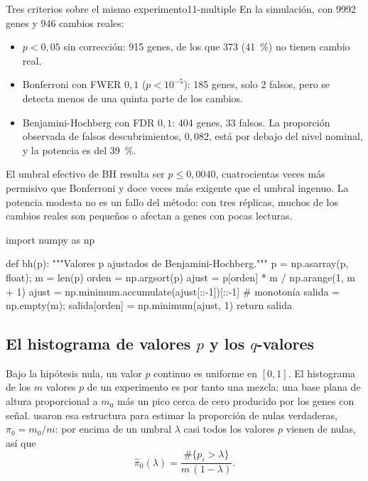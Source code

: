 \begin{ejemplo}{Tres criterios sobre el mismo experimento}{11-multiple}
En la simulación, con \num{9992} genes y \num{946} cambios reales:
\begin{itemize}
  \item $p<0{,}05$ sin corrección: 915 genes, de los que 373 (\SI{41}{\percent}) no tienen cambio real.
  \item Bonferroni con FWER $0{,}1$ ($p<10^{-5}$): 185 genes, solo 2 falsos, pero se detecta menos de una quinta parte de los cambios.
  \item Benjamini-Hochberg con FDR $0{,}1$: 404 genes, 33 falsos. La proporción observada de falsos descubrimientos, $0{,}082$, está por debajo del nivel nominal, y la potencia es del \SI{39}{\percent}.
\end{itemize}
El umbral efectivo de BH resulta ser $p\le0{,}0040$, cuatrocientas veces más permisivo que Bonferroni y doce veces más exigente que el umbral ingenuo. La potencia modesta no es un fallo del método: con tres réplicas, muchos de los cambios reales son pequeños o afectan a genes con pocas lecturas.
\end{ejemplo}

\begin{codigo}
import numpy as np

def bh(p):
    """Valores p ajustados de Benjamini-Hochberg."""
    p = np.asarray(p, float); m = len(p)
    orden = np.argsort(p)
    ajust = p[orden] * m / np.arange(1, m + 1)
    ajust = np.minimum.accumulate(ajust[::-1])[::-1]  # monotonía
    salida = np.empty(m); salida[orden] = np.minimum(ajust, 1)
    return salida
\end{codigo}

\subsection{El histograma de valores $p$ y los $q$-valores}

Bajo la hipótesis nula, un valor $p$ continuo es uniforme en $[0,1]$. El histograma de los $m$ valores $p$ de un experimento es por tanto una mezcla: una base plana de altura proporcional a $m_0$ más un pico cerca de cero producido por los genes con señal. \textcite{c11-storey2003} usaron esa estructura para estimar la proporción de nulas verdaderas, $\pi_0=m_0/m$: por encima de un umbral $\lambda$ casi todos los valores $p$ vienen de nulas, así que
\begin{equation}\label{eq:11-pi0}
\hat\pi_0(\lambda)=\frac{\#\{p_i>\lambda\}}{m\,(1-\lambda)}.
\end{equation}

